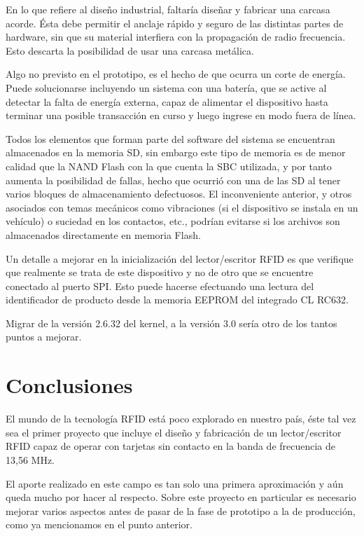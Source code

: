 \documentclass[%
        final,
        notitlepage,
        narroweqnarray,
        inline,
        ]{ieee}
\begin{document}
En lo que refiere al diseño industrial, faltaría diseñar y fabricar una carcasa acorde. 
Ésta debe permitir el anclaje rápido y seguro de las distintas partes de hardware, sin 
que su material interfiera con la propagación de radio frecuencia. Esto descarta la 
posibilidad de usar una carcasa metálica.

Algo no previsto en el prototipo, es el hecho de que ocurra un corte de energía. Puede
solucionarse incluyendo un sistema con una batería, que se active al detectar la falta de 
energía externa, capaz de alimentar el dispositivo hasta terminar una posible transacción en 
curso y luego ingrese en modo fuera de línea.

Todos los elementos que forman parte del software del sistema se encuentran almacenados
en la memoria SD, sin embargo este tipo de memoria es de menor calidad que la NAND Flash
con la que cuenta la SBC utilizada, y por tanto aumenta la posibilidad de fallas, hecho que 
ocurrió con una de las SD al tener varios bloques de almacenamiento defectuosos. El 
inconveniente anterior, y otros asociados con temas mecánicos como vibraciones (si el 
dispositivo se instala en un vehículo) o suciedad en los contactos, etc., podrían evitarse 
si los archivos son almacenados directamente en memoria Flash.

Un detalle a mejorar en la inicialización del lector/escritor RFID es que verifique
que realmente se trata de este dispositivo y no de otro que se encuentre conectado
al puerto SPI. Esto puede hacerse efectuando una lectura del identificador de producto
desde la memoria EEPROM del integrado CL RC632.

Migrar de la versión 2.6.32 del kernel, a la versión 3.0 sería otro de los tantos puntos a mejorar.


\section{Conclusiones}

El mundo de la tecnología RFID está poco explorado en nuestro país, éste 
tal vez sea el primer proyecto que incluye el diseño y fabricación de un 
lector/escritor RFID capaz de operar con tarjetas sin contacto en la banda de
frecuencia de 13,56 MHz.

El aporte realizado en este campo es tan solo una primera aproximación y aún 
queda mucho por hacer al respecto. Sobre este proyecto en particular es
necesario mejorar varios aspectos antes de pasar de la fase de prototipo
a la de producción, como ya mencionamos en el punto anterior.
\end{document}
